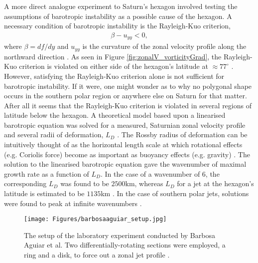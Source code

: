 \documentclass[preprint]{revtex4-1} %
\begin{document}
A more direct analogue experiment to Saturn's hexagon involved testing
the assumptions of barotropic instability as a possible cause of the
hexagon.  A necessary condition of barotropic instability is the
Rayleigh-Kuo criterion, 
\begin{align} 
  \label{eq:rayleighkuo}
  \beta - u_{yy}<0,
\end{align}
where $\beta = df/dy$ and $u_{yy}$ is the curvature of the zonal
velocity profile along the northward direction
\cite{BarbosaAguiar2010}.  As seen in Figure 
\ref{fig:zonalV_vorticityGrad}, the Rayleigh-Kuo criterion is violated
on either side of the hexagon's latitude at $\approx 77^{\circ}$
\cite{BarbosaAguiar2010}.  However, satisfying the Rayleigh-Kuo
criterion alone is not sufficient for barotropic instability.  If it
were, one might wonder as to why no polygonal shape occurs in the
southern polar region or anywhere else on Saturn for that matter.
After all it seems that the Rayleigh-Kuo criterion is violated in
several regions of latitude below the hexagon.  A theoretical model
based upon a linearised barotropic equation was solved for a measured,
Saturnian zonal velocity profile and several radii of deformation, $L_D$
\cite{BarbosaAguiar2010}.   The Rossby radius of deformation can be
intuitively thought of as the horizontal length scale at which rotational effects
(e.g. Coriolis force) become as important as buoyancy
effects (e.g. gravity) \cite{Gill82}.  The solution to the linearised
barotropic equation gave the wavenumber of maximal growth rate as a
function of $L_D$.  In the case of a wavenumber of 6, the
corresponding $L_D$ was found to be $2500$km, whereas $L_D$ for a jet
at the hexagon's latitude is estimated to be $1135$km \cite{BarbosaAguiar2010,
  MoralesJuberias2011}.  In the case of southern polar
jets, solutions were found to peak at infinite wavenumbers
\cite{BarbosaAguiar2010}. 

\begin{figure}
  \centering
  \texttt{[image: Figures/barbosaaguiar\_setup.jpg]}
  \caption{The setup of the laboratory experiment conducted by Barbosa
  Aguiar et al.  Two differentially-rotating sections were employed,
  a ring and a disk, to force out a zonal jet profile
  \cite[fig~4]{BarbosaAguiar2010}.}  
  \label{fig:labSetup}
\end{figure}
\end{document}

